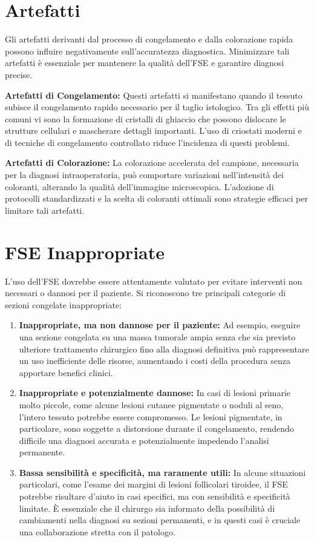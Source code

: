 \section{Artefatti}
Gli artefatti derivanti dal processo di congelamento e dalla colorazione rapida possono influire negativamente sull’accuratezza diagnostica. Minimizzare tali artefatti è essenziale per mantenere la qualità dell'FSE e garantire diagnosi precise.

\textbf{Artefatti di Congelamento:} Questi artefatti si manifestano quando il tessuto subisce il congelamento rapido necessario per il taglio istologico. Tra gli effetti più comuni vi sono la formazione di cristalli di ghiaccio che possono dislocare le strutture cellulari e mascherare dettagli importanti. L'uso di criostati moderni e di tecniche di congelamento controllato riduce l’incidenza di questi problemi.

\textbf{Artefatti di Colorazione:} La colorazione accelerata del campione, necessaria per la diagnosi intraoperatoria, può comportare variazioni nell'intensità dei coloranti, alterando la qualità dell'immagine microscopica. L’adozione di protocolli standardizzati e la scelta di coloranti ottimali sono strategie efficaci per limitare tali artefatti.

\section{FSE Inappropriate}
L'uso dell'FSE dovrebbe essere attentamente valutato per evitare interventi non necessari o dannosi per il paziente. Si riconoscono tre principali categorie di sezioni congelate inappropriate:

\begin{enumerate}
    \item \textbf{Inappropriate, ma non dannose per il paziente:} Ad esempio, eseguire una sezione congelata su una massa tumorale ampia senza che sia previsto ulteriore trattamento chirurgico fino alla diagnosi definitiva può rappresentare un uso inefficiente delle risorse, aumentando i costi della procedura senza apportare benefici clinici.
    
    \item \textbf{Inappropriate e potenzialmente dannose:} In casi di lesioni primarie molto piccole, come alcune lesioni cutanee pigmentate o noduli al seno, l’intero tessuto potrebbe essere compromesso. Le lesioni pigmentate, in particolare, sono soggette a distorsione durante il congelamento, rendendo difficile una diagnosi accurata e potenzialmente impedendo l’analisi permanente.
    
    \item \textbf{Bassa sensibilità e specificità, ma raramente utili:} In alcune situazioni particolari, come l’esame dei margini di lesioni follicolari tiroidee, il FSE potrebbe risultare d’aiuto in casi specifici, ma con sensibilità e specificità limitate. È essenziale che il chirurgo sia informato della possibilità di cambiamenti nella diagnosi su sezioni permanenti, e in questi casi è cruciale una collaborazione stretta con il patologo.
\end{enumerate}

